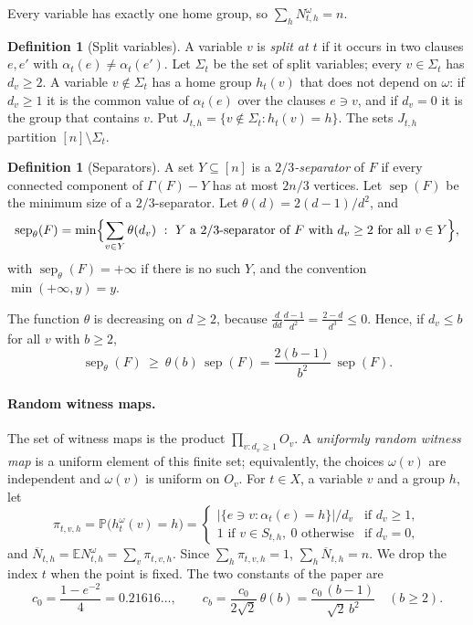 \documentclass[11pt,a4paper]{article}
\theoremstyle{definition}
\newtheorem{definition}[theorem]{Definition}
\theoremstyle{remark}
\newcommand{\E}{\mathbb{E}}
\newcommand{\PP}{\mathbb{P}}
\newcommand{\sep}{\operatorname{sep}}
\newcommand{\sepw}{\operatorname{sep}_{\theta}}
\newcommand{\Gr}{\Gamma}
\newcommand{\Nbar}{\overline{N}}
\begin{document}
Every variable has exactly one home group, so $\sum_hN^\omega_{t,h}=n$.

\begin{definition}[Split variables]\label{def:split}
A variable $v$ is \emph{split at $t$} if it occurs in two clauses $e,e'$ with
$\alpha_t(e)\ne\alpha_t(e')$. Let $\Sigma_t$ be the set of split variables; every
$v\in\Sigma_t$ has $d_v\ge2$. A variable $v\notin\Sigma_t$ has a home group $h_t(v)$ that
does not depend on $\omega$: if $d_v\ge1$ it is the common value of $\alpha_t(e)$ over the
clauses $e\ni v$, and if $d_v=0$ it is the group that contains $v$. Put
$J_{t,h}=\{v\notin\Sigma_t:h_t(v)=h\}$. The sets $J_{t,h}$ partition $[n]\setminus\Sigma_t$.
\end{definition}

\begin{definition}[Separators]\label{def:sep}
A set $Y\subseteq[n]$ is a \emph{$2/3$-separator} of $F$ if every connected component of
$\Gr(F)-Y$ has at most $2n/3$ vertices. Let $\sep(F)$ be the minimum size of a
$2/3$-separator. Let $\theta(d)=2(d-1)/d^2$, and
\[
\sepw(F)=\min\Bigl\{\sum_{v\in Y}\theta(d_v)\ :\ Y\text{ a }2/3\text{-separator of }F
\text{ with }d_v\ge2\text{ for all }v\in Y\Bigr\},
\]
with $\sepw(F)=+\infty$ if there is no such $Y$, and the convention $\min(+\infty,y)=y$.
\end{definition}

The function $\theta$ is decreasing on $d\ge2$, because
$\frac{d}{dd}\frac{d-1}{d^2}=\frac{2-d}{d^3}\le0$. Hence, if $d_v\le b$ for all $v$ with
$b\ge2$,
\begin{equation}\label{eq:sepw}
\sepw(F)\ \ge\ \theta(b)\,\sep(F)=\frac{2(b-1)}{b^2}\,\sep(F).
\end{equation}

\paragraph{Random witness maps.} The set of witness maps is the product
$\prod_{v:d_v\ge1}O_v$. A \emph{uniformly random witness map} is a uniform element of this
finite set; equivalently, the choices $\omega(v)$ are independent and $\omega(v)$ is uniform
on $O_v$. For $t\in X$, a variable $v$ and a group $h$, let
\[
\pi_{t,v,h}=\PP\bigl(h^\omega_t(v)=h\bigr)=
\begin{cases}
|\{e\ni v:\alpha_t(e)=h\}|/d_v&\text{if }d_v\ge1,\\
1\text{ if }v\in S_{t,h},\ 0\text{ otherwise}&\text{if }d_v=0,
\end{cases}
\]
and $\Nbar_{t,h}=\E N^\omega_{t,h}=\sum_v\pi_{t,v,h}$. Since $\sum_h\pi_{t,v,h}=1$,
$\sum_h\Nbar_{t,h}=n$. We drop the index $t$ when the point is fixed. The two constants of
the paper are
\[
c_0=\frac{1-e^{-2}}{4}=0.21616\ldots,\qquad
c_b=\frac{c_0}{2\sqrt2}\,\theta(b)=\frac{c_0\,(b-1)}{\sqrt2\,b^2}\quad(b\ge2).
\]
\end{document}
